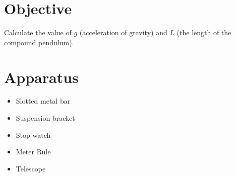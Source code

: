 \documentclass{article}
\begin{document}

   \section*{Objective}
   
      Calculate the value of $g$ (acceleration of gravity) and $L$ (the length of the compound pendulum).

   \section*{Apparatus}

   \begin{itemize}

      \item Slotted metal bar
      \item Suspension bracket
      \item Stop-watch
      \item Meter Rule
      \item Telescope

   \end{itemize}
\end{document}
